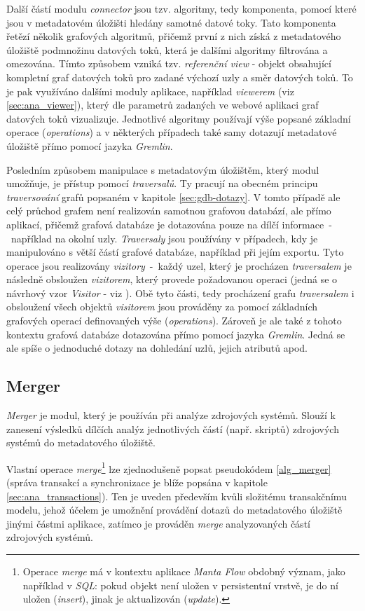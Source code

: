 Další částí modulu \textit{connector} jsou tzv. algoritmy, tedy komponenta, pomocí které jsou v metadatovém úložišti hledány samotné datové toky. Tato komponenta řetězí několik grafových algoritmů, přičemž první z nich získá z metadatového úložiště podmnožinu datových toků, která je dalšími algoritmy filtrována a omezována. Tímto způsobem vzniká tzv. \textit{referenční view} - objekt obsahující kompletní graf datových toků pro zadané výchozí uzly a směr datových toků. To je pak využíváno dalšími moduly aplikace, například \textit{viewerem} (viz \ref{sec:ana_viewer}), který dle parametrů zadaných ve webové aplikaci graf datových toků vizualizuje.
Jednotlivé algoritmy používají výše popsané základní operace (\textit{operations}) a v některých případech také samy dotazují metadatové úložiště přímo pomocí jazyka \textit{Gremlin}.

Posledním způsobem manipulace s metadatovým úložištěm, který modul umožňuje, je přístup pomocí \textit{traversalů}. Ty pracují na obecném principu \textit{traversování} grafů popsaném v kapitole \ref{sec:gdb-dotazy}. V tomto případě ale celý průchod grafem není realizován samotnou grafovou databází, ale přímo aplikací, přičemž grafová databáze je dotazována pouze na dílčí informace~-~například na okolní uzly. \textit{Traversaly} jsou používány v případech, kdy je manipulováno s větší částí grafové databáze, například při jejím exportu. Tyto operace jsou realizovány \textit{vizitory}~-~každý uzel, který je procházen \textit{traversalem} je následně obsloužen \textit{vizitorem}, který provede požadovanou operaci (jedná se o návrhový vzor \textit{Visitor} - viz \cite{Gamma94}). Obě tyto části, tedy procházení grafu \textit{traversalem} i obsloužení všech objektů \textit{visitorem} jsou prováděny za pomocí základních grafových operací definovaných výše (\textit{operations}). Zároveň je ale také z tohoto kontextu grafová databáze dotazována přímo pomocí jazyka \textit{Gremlin}. Jedná se ale spíše o jednoduché dotazy na dohledání uzlů, jejich atributů apod.

\subsection{Merger}
\label{sec:ana_merger}
\textit{Merger} je modul, který je používán při analýze zdrojových systémů. Slouží k zanesení výsledků dílčích analýz jednotlivých částí (např. skriptů) zdrojových systémů do metadatového úložiště.

Vlastní operace \textit{merge}\footnote{Operace \textit{merge} má v kontextu aplikace \textit{Manta Flow} obdobný význam, jako například v \textit{SQL}: pokud objekt není uložen v persistentní vrstvě, je do ní uložen (\textit{insert}), jinak je aktualizován (\textit{update}).} lze zjednodušeně popsat pseudokódem \ref{alg_merger} (správa transakcí a synchronizace je blíže popsána v kapitole \ref{sec:ana_transactions}). Ten je uveden především kvůli složitému transakčnímu modelu, jehož účelem je umožnění provádění dotazů do metadatového úložiště jinými částmi aplikace, zatímco je prováděn \textit{merge} analyzovaných částí zdrojových systémů.

